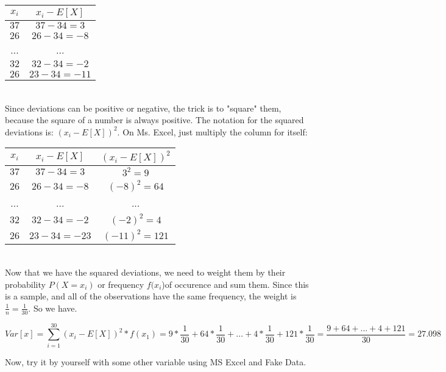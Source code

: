 \documentclass[11pt]{article}
\begin{document}
\begin{tabular}{|c|c|}
	$x_i$ & $x_i - E[X]$\\
	\hline
	$37$ & $37 - 34 = 3$\\
	$26$ & $26 - 34  = -8$\\
	... & ...\\
	$32$ & $32 - 34  = -2$\\
	$26$ & $23 - 34  = -11$\\
\end{tabular}\\

Since deviations can be positive or negative, the trick is to "square" them, because the square of a number is always positive. The notation for the squared deviations is: $(x_i - E[X])^2$. On Ms. Excel, just multiply the column for itself:

\begin{tabular}{|c|c|c|}
	$x_i$ & $x_i - E[X]$ & $(x_i - E[X])^2$\\
	\hline
	$37$ & $37 - 34 = 3$ & $3^2 = 9$\\
	$26$ & $26 - 34  = -8$ & $(-8)^2 = 64$\\
	... & ... & ...\\
	$32$ & $32 - 34  = -2$ & $(-2)^2 = 4$\\
	$26$ & $23 - 34  = -23$ & $(-11)^2 = 121$\\
\end{tabular}\\

Now that we have the squared deviations, we need to weight them by their probability $P(X=x_i)$ or frequency $f(x_i$)of occurence and sum them. Since this is a sample, and all of the observations have the same frequency, the weight is $\frac{1}{n} = \frac{1}{30}$. So we have.

\[Var[x] = \sum_{i=1}^{30} (x_i - E[X])^2 * f(x_1) = 9 * \frac{1}{30} + 64 * \frac{1}{30} + ... + 4 * \frac{1}{30} + 121 * \frac{1}{30} = \frac{9 + 64 + ... + 4 + 121}{30} = 27.098\]

Now, try it by yourself with some other variable using MS Excel and Fake Data.
	
\end{document}

